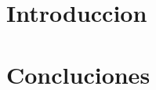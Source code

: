 \documentclass[10pt, a4paper]{article}
\begin{document}

\tableofcontents
\pagebreak
\section{Introduccion}


\section{Concluciones}

\end{document}
